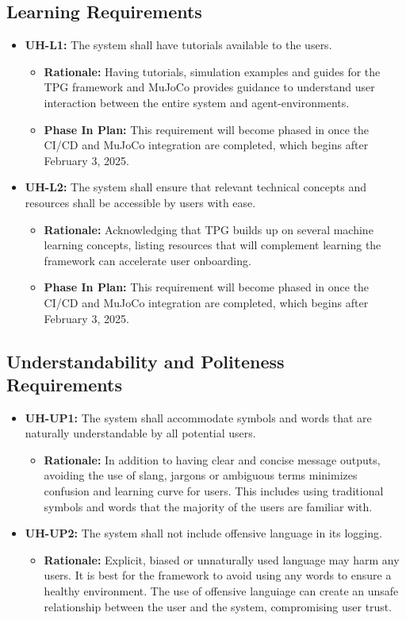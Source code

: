 \documentclass[12pt]{article}
\begin{document}
\subsection{Learning Requirements}
\begin{itemize}
  \item \label{UH-L1} \textbf{UH-L1:} The system shall have tutorials available to the users.
  \begin{itemize}
    \item \textbf{Rationale:} Having tutorials, simulation examples and guides for the TPG framework and MuJoCo provides guidance to understand user interaction between the entire system and agent-environments.
    \item  \textbf{Phase In Plan:} This requirement will become phased in once the CI/CD and MuJoCo integration are completed, which begins after February 3, 2025.
  \end{itemize}
  \item \label{UH-L2} \textbf{UH-L2:} The system shall ensure that relevant technical concepts and resources shall be accessible by users with ease.
  \begin{itemize}
    \item \textbf{Rationale:} Acknowledging that TPG builds up on several machine learning concepts, listing resources that will complement learning the framework can accelerate user onboarding.
    \item \textbf{Phase In Plan:}  This requirement will become phased in once the CI/CD and MuJoCo integration are completed, which begins after February 3, 2025.
  \end{itemize}
\end{itemize}

\subsection{Understandability and Politeness Requirements}
\begin{itemize}
  \item \label{UH-UP1} \textbf{UH-UP1:} The system shall accommodate symbols and words that are naturally understandable by all potential users.
  \begin{itemize}
    \item \textbf{Rationale:} In addition to having clear and concise message outputs, avoiding the use of slang, jargons or ambiguous terms minimizes confusion and learning curve for users. This includes using traditional symbols and words that the majority of the users are familiar with.
  \end{itemize}
  \item \label{UH-UP2} \textbf{UH-UP2:} The system shall not include offensive language in its logging.
  \begin{itemize}
    \item \textbf{Rationale:} Explicit, biased or unnaturally used language may harm any users. It is best for the framework to avoid using any words to ensure a healthy environment. The use of offensive languiage can create an unsafe relationship between the user and the system, compromising user trust.
  \end{itemize}
\end{itemize}
\end{document}
